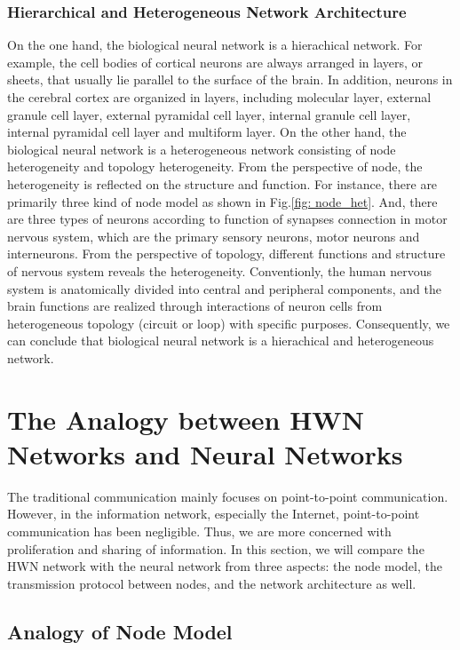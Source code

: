 \documentclass[journal,comsoc]{IEEEtran}
\begin{document}
			\subsubsection{Hierarchical and Heterogeneous Network Architecture}			
				On the one hand, the biological neural network is a hierachical network.
				For example, the cell bodies of cortical neurons are always arranged in layers, or sheets, that usually lie parallel to the surface of the brain\cite{bear2007neuroscience}.
				In addition, neurons in the cerebral cortex are organized in layers, including molecular layer, external granule cell layer, external pyramidal cell layer, internal granule cell layer, internal pyramidal cell layer and multiform layer. 
				On the other hand, the biological neural network is a heterogeneous network consisting of node heterogeneity and topology heterogeneity.
				From the perspective of node,  the heterogeneity is reflected on the structure and function.
				For instance, there are primarily three kind of node model as shown in Fig.\ref{fig: node_het}.
				And, there are three types of neurons according to function of synapses connection in motor nervous system, which are the primary sensory neurons, motor neurons and interneurons.
				From the perspective of topology, different functions and structure of nervous system reveals the heterogeneity.
				Conventionly, the human nervous system is anatomically divided into central and peripheral components, 
				and the brain functions are realized through interactions of neuron cells from heterogeneous topology (circuit or loop) with specific purposes\cite{kandel2000principles}.
				Consequently, we can conclude that biological neural network is a hierachical and heterogeneous network.
	
	\section{The Analogy between HWN Networks and Neural Networks}
	\label{section: analogy}
		The traditional communication mainly focuses on point-to-point communication.
		However, in the information network, especially the Internet, point-to-point communication has been negligible. 
		Thus, we are more concerned with proliferation and sharing of information.
		In this section, we will compare the HWN network with the neural network from three aspects: the node model, the transmission protocol between nodes, and the network architecture as well.
		
		\subsection{Analogy of Node Model}
		\label{subsec: analogy_of_node_model}
\end{document}

